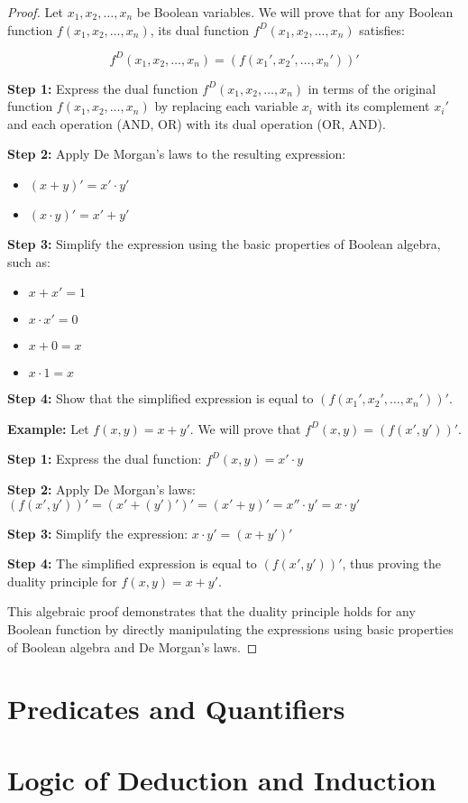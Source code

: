     \begin{proof}
        Let $x_1, x_2, \ldots, x_n$ be Boolean variables. We will prove that for any Boolean function $f(x_1, x_2, \ldots, x_n)$, its dual function $f^D(x_1, x_2, \ldots, x_n)$ satisfies:

		\[f^D(x_1, x_2, \ldots, x_n) = (f(x_1', x_2', \ldots, x_n'))'\]
		
		\textbf{Step 1:} Express the dual function $f^D(x_1, x_2, \ldots, x_n)$ in terms of the original function $f(x_1, x_2, \ldots, x_n)$ by replacing each variable $x_i$ with its complement $x_i'$ and each operation (AND, OR) with its dual operation (OR, AND).
		
		\textbf{Step 2:} Apply De Morgan's laws to the resulting expression:
		\begin{itemize}
		    \item $(x + y)' = x' \cdot y'$
		    \item $(x \cdot y)' = x' + y'$
		\end{itemize}
		
		\textbf{Step 3:} Simplify the expression using the basic properties of Boolean algebra, such as:
		\begin{itemize}
		    \item $x + x' = 1$
		    \item $x \cdot x' = 0$
		    \item $x + 0 = x$
		    \item $x \cdot 1 = x$
		\end{itemize}
		
		\textbf{Step 4:} Show that the simplified expression is equal to $(f(x_1', x_2', \ldots, x_n'))'$.
		
		\textbf{Example:}
		Let $f(x, y) = x + y'$. We will prove that $f^D(x, y) = (f(x', y'))'$.
		
		\textbf{Step 1:} Express the dual function:
		$f^D(x, y) = x' \cdot y$
		
		\textbf{Step 2:} Apply De Morgan's laws:
		$(f(x', y'))' = (x' + (y')')' = (x' + y)' = x'' \cdot y' = x \cdot y'$
		
		\textbf{Step 3:} Simplify the expression:
		$x \cdot y' = (x + y')'$
		
		\textbf{Step 4:} The simplified expression is equal to $(f(x', y'))'$, thus proving the duality principle for $f(x, y) = x + y'$.

		This algebraic proof demonstrates that the duality principle holds for any Boolean function by directly manipulating the expressions using basic properties of Boolean algebra and De Morgan's laws. 
    \end{proof}



    \section{Predicates and Quantifiers}


    \section{Logic of Deduction and Induction}